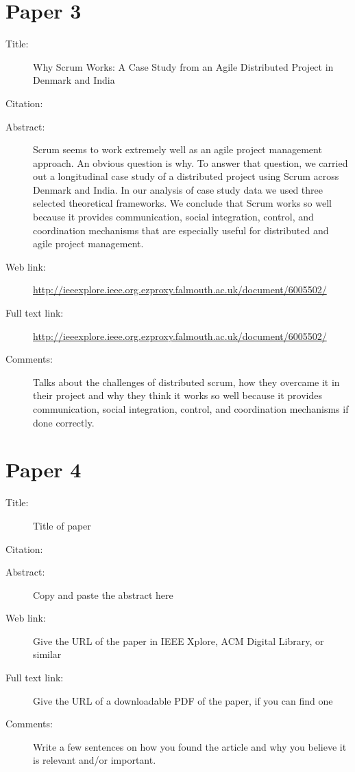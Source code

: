 \documentclass{scrartcl}
\begin{document}
\section*{Paper 3}
\begin{description}
\item[Title:] Why Scrum Works: A Case Study from an Agile Distributed Project in Denmark and India
\item[Citation:] \cite{bibtex_key}
\item[Abstract:] Scrum seems to work extremely well as an agile project management approach. An obvious question is why. To answer that question, we carried out a longitudinal case study of a distributed project using Scrum across Denmark and India. In our analysis of case study data we used three selected theoretical frameworks. We conclude that Scrum works so well because it provides communication, social integration, control, and coordination mechanisms that are especially useful for distributed and agile project management.
\item[Web link:] \url{http://ieeexplore.ieee.org.ezproxy.falmouth.ac.uk/document/6005502/}
\item[Full text link:] \url{http://ieeexplore.ieee.org.ezproxy.falmouth.ac.uk/document/6005502/}
\item[Comments:] Talks about the challenges of distributed scrum, how they overcame it in their project and why they think it works so well because it provides communication, social integration, control, and coordination mechanisms if done correctly.
\end{description}

\section*{Paper 4}
\begin{description}
\item[Title:] Title of paper
\item[Citation:] \cite{bibtex_key}
\item[Abstract:] Copy and paste the abstract here
\item[Web link:] Give the URL of the paper in IEEE Xplore, ACM Digital Library, or similar
\item[Full text link:] Give the URL of a downloadable PDF of the paper, if you can find one
\item[Comments:] Write a few sentences on how you found the article and why you believe it is relevant and/or important.
\end{description}
\end{document}
